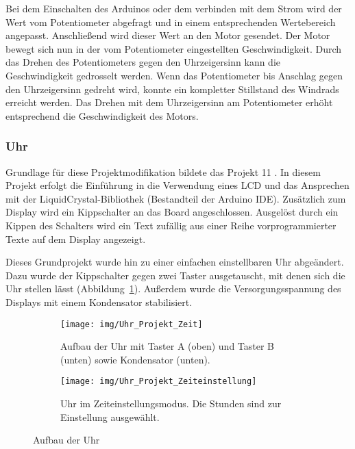 Bei dem Einschalten des Arduinos oder dem verbinden mit dem Strom wird der Wert vom Potentiometer abgefragt und in einem entsprechenden Wertebereich angepasst. Anschließend wird dieser Wert an den Motor gesendet. Der Motor bewegt sich nun in der vom Potentiometer eingestellten Geschwindigkeit. Durch das Drehen des Potentiometers gegen den Uhrzeigersinn kann die Geschwindigkeit gedrosselt werden. Wenn das Potentiometer bis Anschlag gegen den Uhrzeigersinn gedreht wird, konnte ein kompletter Stillstand des Windrads erreicht werden. Das Drehen mit dem Uhrzeigersinn am Potentiometer erhöht entsprechend die Geschwindigkeit des Motors.


\subsubsection{Uhr}
Grundlage für diese Projektmodifikation bildete das Projekt 11 \autocite{arduino}. In diesem Projekt erfolgt die Einführung in die Verwendung eines LCD und das Ansprechen mit der LiquidCrystal-Bibliothek (Bestandteil der Arduino IDE).
Zusätzlich zum Display wird ein Kippschalter an das Board angeschlossen. Ausgelöst durch ein Kippen des Schalters wird ein Text zufällig aus einer Reihe vorprogrammierter Texte auf dem Display angezeigt.

Dieses Grundprojekt wurde hin zu einer einfachen einstellbaren Uhr abgeändert. Dazu wurde der Kippschalter gegen zwei Taster ausgetauscht, mit denen sich die Uhr stellen lässt (Abbildung~\ref{fig:zeit}). Außerdem wurde die Versorgungsspannung des Displays mit einem Kondensator stabilisiert.

\begin{figure}[h]
    \centering
    \begin{subfigure}[b]{0.48\linewidth}
        \centering
        \texttt{[image: img/Uhr\_Projekt\_Zeit]}
        \caption{Aufbau der Uhr mit Taster A (oben) und Taster B (unten) sowie Kondensator (unten).}\label{fig:zeit}
    \end{subfigure}\enspace%
    \begin{subfigure}[b]{0.48\linewidth}
        \centering
        \texttt{[image: img/Uhr\_Projekt\_Zeiteinstellung]}
        \caption{Uhr im Zeiteinstellungsmodus. Die Stunden sind zur Einstellung ausgewählt.}\label{fig:zeiteinstell}
    \end{subfigure}
    \caption{Aufbau der Uhr}\label{fig:uhr}
\end{figure}

